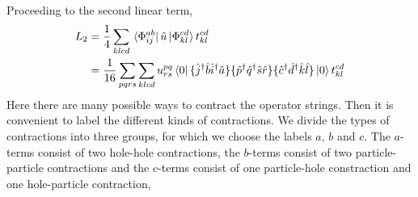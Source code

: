 Proceeding to the second linear term,
\begin{equation}
    \begin{aligned}
    L_2 &= \frac{1}{4}\sum_{klcd} \bra*{\Phi^{ab}_{ij}} \hat{u} \ket*{\Phi^{cd}_{kl}} t^{cd}_{kl} \\
        &= \frac{1}{16}\sum_{pqrs} \sum_{klcd} u^{pq}_{rs} \bra{0}
            \{\hat{j}^\dagger \hat{b} \hat{i}^\dagger  \hat{a} \}
            \{\hat{p}^\dagger \hat{q}^\dagger \hat{s} \hat{r} \}
            \{\hat{c}^\dagger \hat{d}^\dagger \hat{k} \hat{l} \}
        \ket{0}t^{cd}_{kl}
    \end{aligned}
\end{equation}
Here there are many possible ways to contract the operator strings. Then it is convenient
to label the different kinds of contractions. We divide the types of contractions into
three groups, for which we choose the labels $a$, $b$ and $c$. The $a$-terms
consist of two
hole-hole contractions, the $b$-terms consist of two particle-particle
contractions and the $c$-terms consist of one particle-hole constraction and one
hole-particle contraction,
